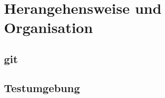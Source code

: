 \chapter{Herangehensweise und Organisation} %
\label{Herangehensweise} %

\section{git}

\section{Testumgebung}
